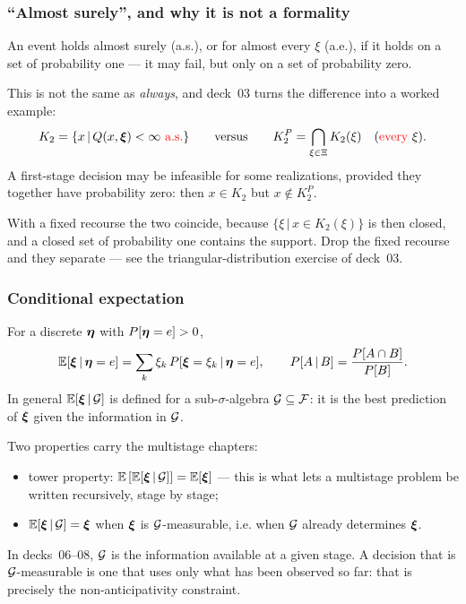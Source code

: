 \documentclass[aspectratio=169]{beamer}
\begin{document}
\begin{frame}
\frametitle{``Almost surely'', and why it is not a formality}

An event holds {\red almost surely} (a.s.), or for {\red almost every} $\xi$ (a.e.), if it holds on a set of probability one --- it may fail, but only on a set of probability zero.

\mbox{}

This is not the same as {\it always}, and deck~03 turns the difference into a worked example:
\[
K_2 = \lbrace x \,|\, Q(x,{\boldsymbol{\xi}}) < \infty \text{ {\color{red}a.s.}} \rbrace
\qquad \text{versus} \qquad
K_2^P = \bigcap_{\xi \in \Xi} K_2(\xi) \quad \text{({\color{red}every} $\xi$)}.
\]
A first-stage decision may be infeasible for some realizations, provided they together have probability zero: then $x \in K_2$ but $x \notin K_2^P$.

\mbox{}

With a {\red fixed} recourse the two coincide, because $\lbrace \xi \,|\, x \in K_2(\xi) \rbrace$ is then closed, and a closed set of probability one contains the support. Drop the fixed recourse and they separate --- see the triangular-distribution exercise of deck~03.

\end{frame}

\begin{frame}
\frametitle{Conditional expectation}

For a discrete ${\boldsymbol{\eta}}$ with $P[{\boldsymbol{\eta}} = e] > 0$,
\[
{\mathbb{E}}[{\boldsymbol{\xi}} \,|\, {\boldsymbol{\eta}} = e] = \sum_k \xi_k \, P[{\boldsymbol{\xi}} = \xi_k \,|\, {\boldsymbol{\eta}} = e],
\qquad
P[A\,|\,B] = \frac{P[A \cap B]}{P[B]}.
\]
In general ${\mathbb{E}}[{\boldsymbol{\xi}} \,|\, {\mathcal{G}}]$ is defined for a sub-$\sigma$-algebra ${\mathcal{G}} \subseteq {\mathcal{F}}$: it is the best prediction of ${\boldsymbol{\xi}}$ given the information in ${\mathcal{G}}$.

\mbox{}

Two properties carry the multistage chapters:
\begin{itemize}
\item
{\red tower property}: ${\mathbb{E}}\left[{\mathbb{E}}[{\boldsymbol{\xi}} \,|\, {\mathcal{G}}]\right] = {\mathbb{E}}[{\boldsymbol{\xi}}]$ --- this is what lets a multistage problem be written recursively, stage by stage;
\item
${\mathbb{E}}[{\boldsymbol{\xi}} \,|\, {\mathcal{G}}] = {\boldsymbol{\xi}}$ when ${\boldsymbol{\xi}}$ is ${\mathcal{G}}$-measurable, i.e. when ${\mathcal{G}}$ already determines ${\boldsymbol{\xi}}$.
\end{itemize}

\mbox{}

{\footnotesize In decks~06--08, ${\mathcal{G}}$ is the information available at a given stage. A decision that is ${\mathcal{G}}$-measurable is one that uses only what has been observed so far: that is precisely the {\red non-anticipativity} constraint.}

\end{frame}
\end{document}

